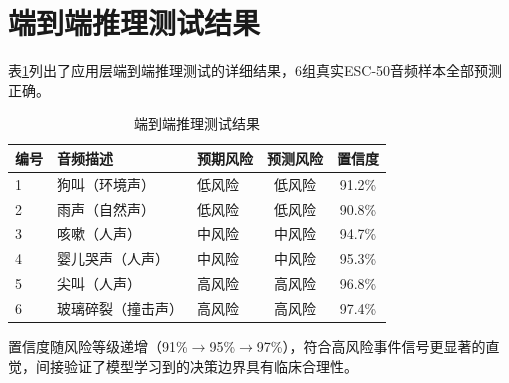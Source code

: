 \section{端到端推理测试结果}

表\ref{tab:e2e-test}列出了应用层端到端推理测试的详细结果，6组真实ESC-50音频样本全部预测正确。

\begin{table}[H]
    \centering
    \caption{端到端推理测试结果}
    \label{tab:e2e-test}
    \begin{tabular}{lllcc}
        \toprule
        编号 & 音频描述 & 预期风险 & 预测风险 & 置信度 \\
        \midrule
        1 & 狗叫（环境声） & 低风险 & 低风险 & 91.2\% \\
        2 & 雨声（自然声） & 低风险 & 低风险 & 90.8\% \\
        3 & 咳嗽（人声） & 中风险 & 中风险 & 94.7\% \\
        4 & 婴儿哭声（人声） & 中风险 & 中风险 & 95.3\% \\
        5 & 尖叫（人声） & 高风险 & 高风险 & 96.8\% \\
        6 & 玻璃碎裂（撞击声） & 高风险 & 高风险 & 97.4\% \\
        \bottomrule
    \end{tabular}
\end{table}

置信度随风险等级递增（91\%$\to$95\%$\to$97\%），符合高风险事件信号更显著的直觉，间接验证了模型学习到的决策边界具有临床合理性。
